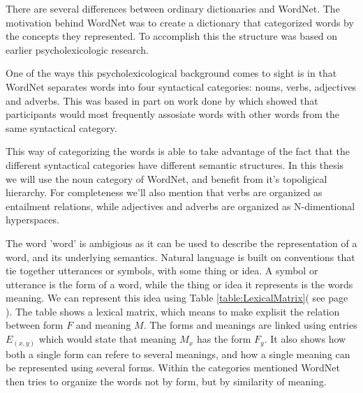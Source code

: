 There are several differences between ordinary dictionaries and WordNet. 
The motivation behind WordNet was to create a dictionary that categorized words by the concepts they represented.
To accomplish this the structure was based on earlier psycholexicologic research\citep{Miller1990}.
 
One of the ways this psycholexicological background comes to sight is in that WordNet separates words into four syntactical categories: nouns, verbs, adjectives and adverbs\citep{Miller1995}.
This was based in part on work done by \citet{Fillenbaum1965} which showed that participants would most frequently 
assosiate words with other words from the same syntactical category.

This way of categorizing the words is able to take advantage of the fact that the different syntactical categories have different semantic structures.
In this thesis we will use the noun category of WordNet, and benefit from it's topoligical hierarchy.
For completeness we'll also mention that verbs are organized as entailment relations, 
while adjectives and adverbs are organized as N-dimentional hyperspaces\citep{Miller1990}.

The word 'word' is ambigious as it can be used to describe the representation of a word, and its underlying semantics.
Natural language is built on conventions that tie together utterances or symbols, with some thing or idea.
A symbol or utterance is the form of a word, while the thing or idea it represents is the words meaning.
We can represent this idea using Table \ref{table:LexicalMatrix}( see page \pageref{table:LexicalMatrix}).
The table shows a lexical matrix, which means to make explisit the relation between form $F$ and meaning $M$.
The forms and meanings are linked using entries $E_{(x,y)}$ which would state that meaning $M_x$ has the form $F_y$.
It also shows how both a single form can refere to several meanings, 
and how a single meaning can be represented using several forms.
Within the categories mentioned WordNet then tries to organize the words not by form, 
but by similarity of meaning.

